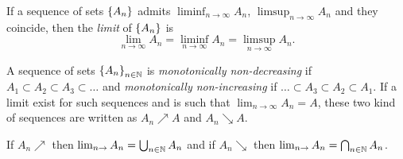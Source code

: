 \begin{definition}
    If a sequence of sets $\left\lbrace A_{n} \right\rbrace$ admits $\liminf_{n\rightarrow\infty} A_{n}$, $\limsup_{n\rightarrow\infty} A_{n}$ and they coincide, then the \emph{limit} of $\left\lbrace A_{n} \right\rbrace$ is 
    \begin{equation*}
        \lim_{n\rightarrow\infty} A_{n} = \liminf_{n\rightarrow\infty} A_{n} = \limsup_{n\rightarrow\infty} A_{n}.
    \end{equation*}
\end{definition}

\begin{definition}[Monotonicity]
    A sequence of sets $\left\lbrace A_{n} \right\rbrace_{n\in\mathbb{ N}}$ is \emph{monotonically non-decreasing} if $A_{1}\subset A_{2}\subset A_{3}\subset\ldots$ and \emph{monotonically non-increasing} if $\ldots\subset A_{3}\subset A_{2}\subset A_{1}$. If a limit exist for such sequences and is such that $\lim_{n\rightarrow\infty}A_{n}=A$, these two kind of sequences are written as $A_{n}\nearrow A$ and $A_{n}\searrow A$.
\end{definition}

\begin{proposition}
    If $A_{n}\nearrow$ then $\lim_{n\rightarrow}A_{n}=\bigcup_{n\in\mathbb{ N}}A_{n}$ and if $A_{n}\searrow$ then $\lim_{n\rightarrow}A_{n}=\bigcap_{n\in\mathbb{ N}}A_{n}$.
\end{proposition}

